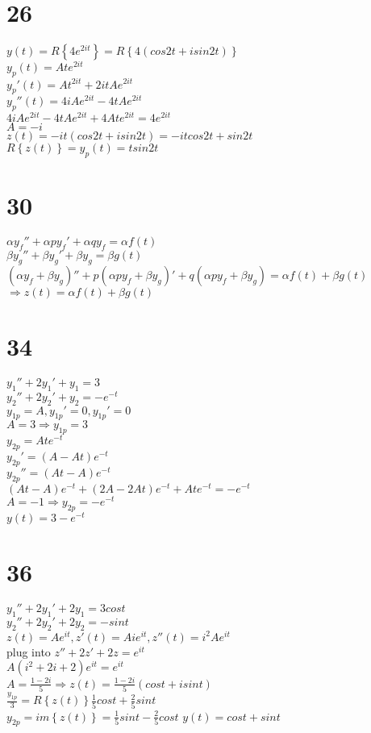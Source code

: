 \documentclass[12pt, a4paper]{IEEEtran}
\begin{document}
\begin{flushleft}
    \section*{26}
    $y(t)=R\left\{4e^{2it}\right\}=R\left\{4(cos2t+isin2t)\right\}$\\
    $y_p(t)=Ate^{2it}$\\
    $y_p'(t)=At^{2it}+2itAe^{2it}$\\
    $y_p''(t)=4iAe^{2it}-4tAe^{2it}$\\
    $4iAe^{2it}-4tAe^{2it}+4Ate^{2it}=4e^{2it}$\\
    $A=-i$\\
    $z(t)=-it(cos2t+isin2t)=-itcos2t+sin2t$\\
    $R\left\{z(t)\right\}=y_p(t)=tsin2t$

    \section*{30}
    $\alpha y_f''+\alpha py_f'+\alpha qy_f=\alpha f(t)$\\
    $\beta y_g''+\beta y_g'+\beta y_g=\beta g(t)$\\
    $(\alpha y_f+\beta y_g)''+p(\alpha py_f+\beta y_g)'+q(\alpha py_f+\beta y_g)=\alpha f(t)+\beta g(t)$\\
    $\Rightarrow z(t)=\alpha f(t)+\beta g(t)$

    \section*{34}
    $y_1''+2y_1'+y_1=3$\\
    $y_2''+2y_2'+y_2=-e^{-t}$\\
    $y_{1p}=A,y_{1p}'=0,y_{1p}'=0$\\
    $A=3\Rightarrow y_{1p}=3$\\
    $y_{2p}=Ate^{-t}$\\
    $y_{2p}'=(A-At)e^{-t}$\\
    $y_{2p}''=(At-A)e^{-t}$\\
    $(At-A)e^{-t}+(2A-2At)e^{-t}+Ate^{-t}=-e^{-t}$\\
    $A=-1\Rightarrow y_{2p}=-e^{-t}$\\
    $y(t)=3-e^{-t}$\\
    
    \section*{36}
    $y_1''+2y_1'+2y_1=3cost$\\
    $y_2''+2y_2'+2y_2=-sint$\\
    $z(t)=Ae^{it},z'(t)=Aie^{it},z''(t)=i^2Ae^{it}$\\
    plug into $z''+2z'+2z=e^{it}$\\
    $A(i^2+2i+2)e^{it}=e^{it}$\\
    $A=\frac{1-2i}{5}\Rightarrow z(t)=\frac{1-2i}{5}(cost+isint)$\\
    $\frac{y_{1p}}{3}=R\left\{z(t)\right\}\frac{1}{5}cost+\frac{2}{5}sint$\\
    $y_{2p}=im\left\{z(t)\right\}=\frac{1}{5}sint-\frac{2}{5}cost$
    $y(t)=cost+sint$


\end{flushleft}
\end{document}
